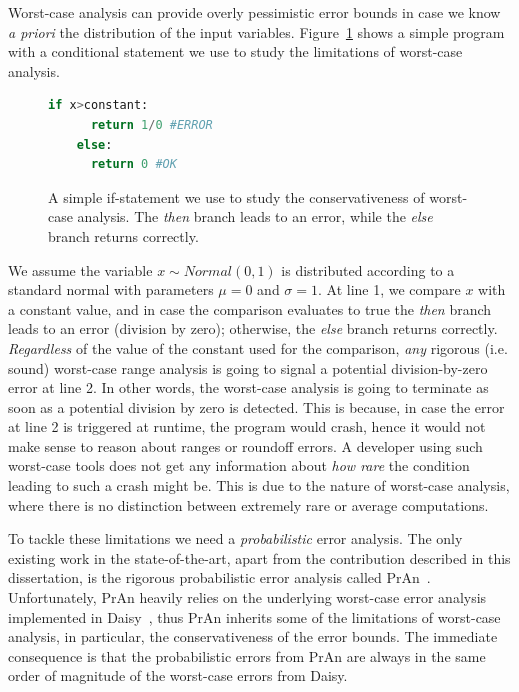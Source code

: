Worst-case analysis can provide overly pessimistic error bounds in case we know \emph{a priori} the distribution of the input variables. 
%
%
Figure~\ref{fig:prob} shows a simple program with a conditional statement we use to study the limitations of worst-case analysis.
%
\begin{figure}[b!]
	\begin{lstlisting}[frame=single, language=Python]
	if x>constant:
	  return 1/0 #ERROR
	else:
	  return 0 #OK
	\end{lstlisting}
	\caption{A simple if-statement we use to study the conservativeness of worst-case analysis. The \emph{then} branch leads to an error, while the \emph{else} branch returns correctly.}
	\label{fig:prob}
\end{figure}
%
We assume the variable $x\sim Normal(0,1)$ is distributed according to a standard normal with parameters $\mu = 0$ and $\sigma = 1$.
%
At line 1, we compare $x$ with a constant value, and in case the comparison evaluates to true the \emph{then} branch leads to an error (division by zero); otherwise, the \emph{else} branch returns correctly.
%
\emph{Regardless} of the value of the constant used for the comparison, \emph{any} rigorous (i.e. sound) worst-case range analysis is going to signal a potential division-by-zero error at line 2.
%
In other words, the worst-case analysis is going to terminate as soon as a potential division by zero is detected.
%
This is because, in case the error at line 2 is triggered at runtime, the program would crash, hence it would not make sense to reason about ranges or roundoff errors.
%
A developer using such worst-case tools does not get any information about \emph{how rare} the condition leading to such a crash might be.
%
This is due to the nature of worst-case analysis, where there is no distinction between extremely rare or average computations.
%

To tackle these limitations we need a \emph{probabilistic} error analysis.
%
The only existing work in the state-of-the-art, apart from the contribution described in this dissertation, is the rigorous probabilistic error analysis called PrAn~\cite{probdaisy}.
%
Unfortunately, PrAn heavily relies on the underlying worst-case error analysis implemented in Daisy~\cite{darulova2018daisy}, thus PrAn inherits some of the limitations of worst-case analysis, in particular, the conservativeness of the error bounds.
%
The immediate consequence is that the probabilistic errors from PrAn are always in the same order of magnitude of the worst-case errors from Daisy.
%

